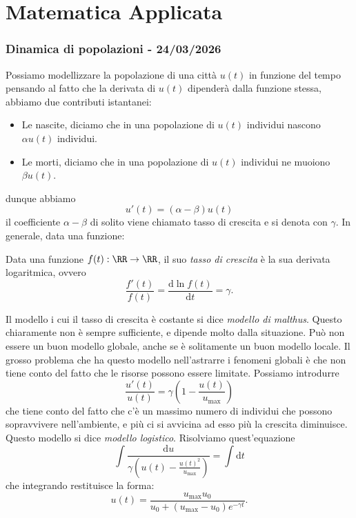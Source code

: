 \documentclass[11pt]{scrartcl}
\newcommand{\dif}{\text{d}}
\begin{document}
	\part{Matematica Applicata}
	
	\section{Dinamica di popolazioni - 24/03/2026}
	Possiamo modellizzare la popolazione di una città $u(t)$ in funzione del tempo pensando al fatto che la derivata di $u(t)$ dipenderà dalla funzione stessa, abbiamo due contributi istantanei:
	\begin{itemize}
		\item Le nascite, diciamo che in una popolazione di $u(t)$ individui nascono $\alpha u(t)$ individui.
		\item Le morti, diciamo che in una popolazione di $u(t)$ individui ne muoiono $\beta u(t)$.
	\end{itemize}
	dunque abbiamo
	$$u'(t)=(\alpha-\beta)u(t)$$
	il coefficiente $\alpha-\beta$ di solito viene chiamato tasso di crescita e si denota con $\gamma$. In generale, data una funzione:
	\begin{definition}
		Data una funzione $f(t):\RR\to\RR$, il suo \textit{tasso di crescita} è la sua derivata logaritmica, ovvero
		$$\frac{f'(t)}{f(t)}=\frac{\dif \ln f(t)}{\dif t}=\gamma.$$
	\end{definition}
	Il modello i cui il tasso di crescita è costante si dice \textit{modello di malthus}. Questo chiaramente non è sempre sufficiente, e dipende molto dalla situazione. Può non essere un buon modello globale, anche se è solitamente un buon modello locale. Il grosso problema che ha questo modello nell'astrarre i fenomeni globali è che non tiene conto del fatto che le risorse possono essere limitate. Possiamo introdurre 
	$$\frac{u'(t)}{u(t)}=\gamma\left(1-\frac{u(t)}{u_{\text{max}}}\right)$$
	che tiene conto del fatto che c'è un massimo numero di individui che possono sopravvivere nell'ambiente, e più ci si avvicina ad esso più la crescita diminuisce. Questo modello si dice \textit{modello logistico}. Risolviamo quest'equazione
	$$\int \frac{\dif u}{\gamma \left(u(t)-\frac{u(t)^2}{u_\text{max}}\right)}=\int \dif t$$
	che integrando restituisce la forma:
	$$u(t)=\frac{u_\text{max}u_0}{u_0+(u_\text{max}-u_0)e^{-\gamma t}}.$$
	
\end{document}
